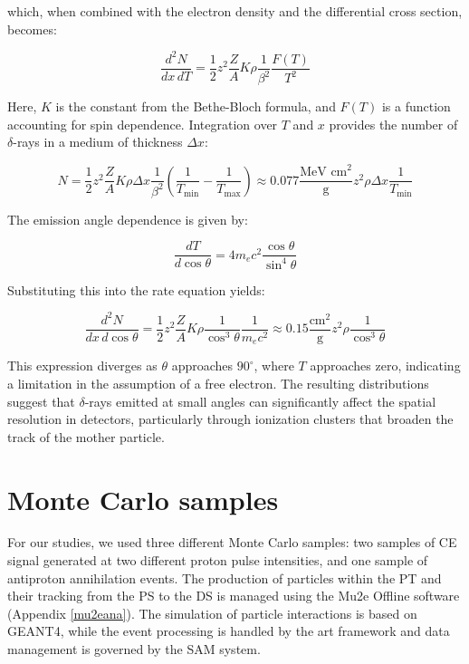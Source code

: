 which, when combined with the electron density and the differential cross section, becomes:

\begin{equation}
\frac{d^2 N}{dx \, dT} = \frac{1}{2} z^2 \frac{Z}{A} K \rho \frac{1}{\beta^2} \frac{F(T)}{T^2}
\end{equation}

Here, $K$ is the constant from the Bethe-Bloch formula, 
and $F(T)$ is a function accounting for spin dependence. 
Integration over $T$ and $x$ provides the number of $\delta$-rays in a medium of thickness $\Delta x$:

\begin{equation}
N = \frac{1}{2} z^2 \frac{Z}{A} K \rho \Delta x \frac{1}{\beta^2} \left(\frac{1}{T_{\text{min}}} - \frac{1}{T_{\text{max}}}\right) \approx 0.077 \frac{\text{MeV cm}^2}{\text{g}} z^2 \rho \Delta x \frac{1}{T_{\text{min}}}
\end{equation}

The emission angle dependence is given by:

\begin{equation}
\frac{dT}{d \cos \theta} = 4 m_e c^2 \frac{\cos \theta}{\sin^4 \theta}
\end{equation}

Substituting this into the rate equation yields:

\begin{equation}
\frac{d^2 N}{dx \, d \cos \theta} = \frac{1}{2} z^2 \frac{Z}{A} K \rho \frac{1}{\cos^3 \theta} \frac{1}{m_e c^2} \approx 0.15 \frac{\text{cm}^2}{\text{g}} z^2 \rho \frac{1}{\cos^3 \theta}
\end{equation}

This expression diverges as $\theta$ approaches $90^\circ$, 
where $T$ approaches zero, indicating a limitation in the 
assumption of a free electron. The resulting distributions 
suggest that $\delta$-rays emitted at small angles can 
significantly affect the spatial resolution in detectors, 
particularly through ionization clusters that broaden the 
track of the mother particle.



\section{Monte Carlo samples}\label{datasample}
For our studies, we used three different  
Monte Carlo samples: two samples of 
CE signal generated at two different 
proton pulse intensities, and one sample of 
antiproton annihilation events. 
The production of particles within 
the PT and their tracking from the PS to the 
DS is managed using the Mu2e Offline software 
(Appendix \ref{mu2eana}). The simulation of 
particle interactions is based on 
GEANT4, while the event processing is handled 
by the art framework and data 
management is governed by the SAM system.

